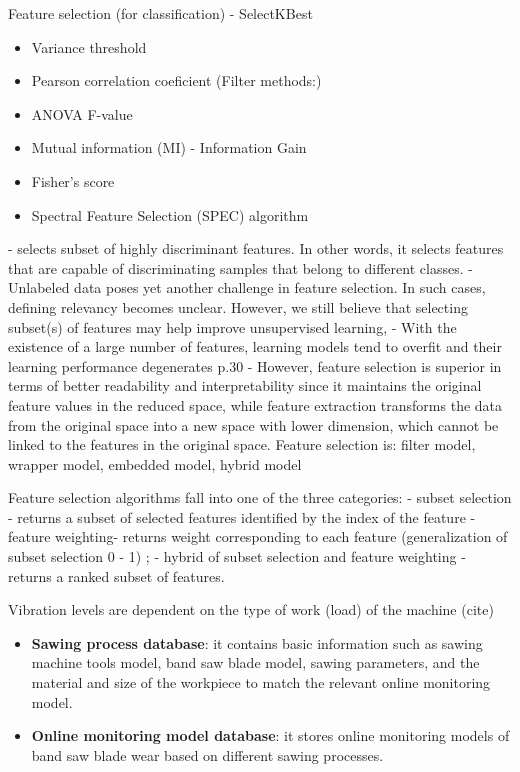 Feature selection (for classification) - SelectKBest
\begin{itemize}
	\item Variance threshold
	\item Pearson correlation coeficient
	(Filter methods:)
	\item ANOVA F-value
	\item Mutual information (MI) - Information Gain
	\item Fisher's score
	\item Spectral Feature Selection (SPEC) algorithm
\end{itemize}
		-  selects subset of highly discriminant features. In other words, it selects features that are capable of discriminating samples that belong to different classes.
		- Unlabeled data poses yet another challenge in feature selection. In such cases, defining relevancy becomes unclear. However, we still believe that selecting subset(s) of features may help improve unsupervised learning, 
		- With the existence of a large number of features, learning models tend to overfit and their learning performance degenerates
p.30 - However, feature selection is superior in terms of better readability and interpretability since it maintains the original feature values in the reduced space, 
while feature extraction transforms the data from the original space into a new space with lower dimension, which cannot be linked to the features in the original space.
Feature selection is: filter model, wrapper model, embedded model, hybrid model

Feature selection algorithms fall into one of the three categories: 
- subset selection -  returns a subset of selected features identified by the index of the feature 
- feature weighting- returns weight corresponding to each feature (generalization of subset selection  0 - 1) ;
- hybrid of subset selection and feature weighting - returns a ranked subset of features.

Vibration levels are dependent on the type of work (load) of the machine (cite)
\begin{itemize}
\item \textbf{Sawing process database}: it contains basic information such as sawing machine tools model, band saw blade model, sawing parameters, and the material and size of the workpiece to match the relevant online monitoring model.
\item \textbf{Online monitoring model database}: it stores online monitoring models of band saw blade wear based on different sawing processes.
\end{itemize}










